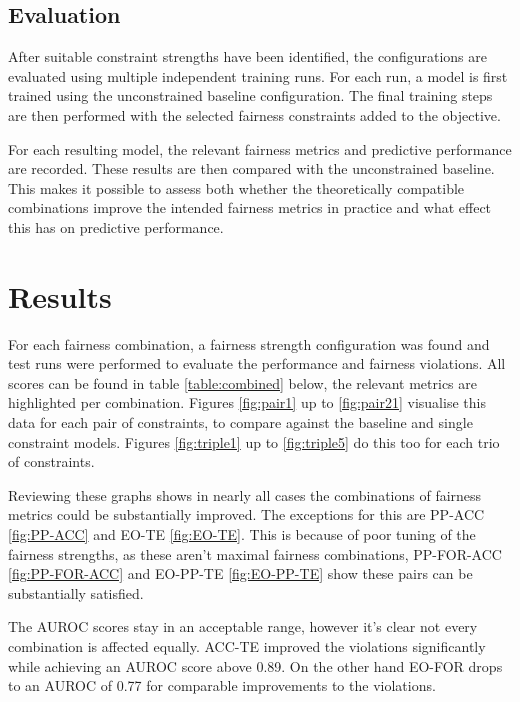 \subsection{Evaluation}
After suitable constraint strengths have been identified, the configurations are evaluated using multiple independent training runs. For each run, a model is first trained using the unconstrained baseline configuration. The final training steps are then performed with the selected fairness constraints added to the objective.

For each resulting model, the relevant fairness metrics and predictive performance are recorded. These results are then compared with the unconstrained baseline. This makes it possible to assess both whether the theoretically compatible combinations improve the intended fairness metrics in practice and what effect this has on predictive performance.

\section{Results}
For each fairness combination, a fairness strength configuration was found and test runs were performed to evaluate the performance and fairness violations. All scores can be found in table \ref{table:combined} below, the relevant metrics are highlighted per combination. 
Figures \ref{fig:pair1} up to \ref{fig:pair21} visualise this data for each pair of constraints, to compare against the baseline and single constraint models. Figures \ref{fig:triple1} up to \ref{fig:triple5} do this too for each trio of constraints.

Reviewing these graphs shows in nearly all cases the combinations of fairness metrics could be substantially improved. The exceptions for this are PP-ACC \ref{fig:PP-ACC} and EO-TE \ref{fig:EO-TE}. This is because of poor tuning of the fairness strengths, as these aren't maximal fairness combinations, PP-FOR-ACC \ref{fig:PP-FOR-ACC} and EO-PP-TE \ref{fig:EO-PP-TE} show these pairs can be substantially satisfied.

The AUROC scores stay in an acceptable range, however it's clear not every combination is affected equally. ACC-TE improved the violations significantly while achieving an AUROC score above 0.89. On the other hand EO-FOR drops to an AUROC of 0.77 for comparable improvements to the violations.

